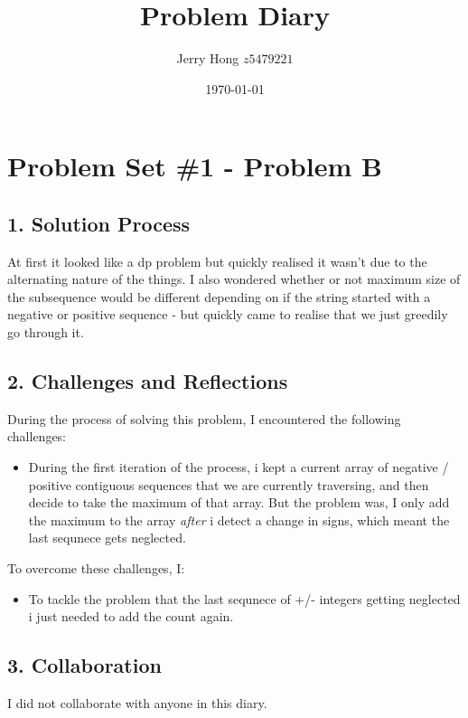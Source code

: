 \documentclass[a4paper,12pt]{article}
\title{Problem Diary}
\author{Jerry Hong $z5479221$}
\date{\today}
\begin{document}
\maketitle

\section*{Problem Set \#1 - Problem B}

\subsection*{1. Solution Process}

At first it looked like a dp problem but quickly realised it wasn't due to the alternating nature of the things. I also wondered whether or not maximum size of the subsequence would be different depending on if the string started with a negative or positive sequence - but quickly came to realise that we just greedily go through it.


\subsection*{2. Challenges and Reflections}
During the process of solving this problem, I encountered the following challenges:
\begin{itemize}
    \item 
During the first iteration of the process, i kept a current array of negative / positive contiguous sequences that we are currently traversing, and then decide to take the maximum of that array. But  the problem was, I only add the maximum to the array \emph{after} i detect a change in signs, which meant the last sequnece gets neglected. 
\end{itemize}

To overcome these challenges, I:
\begin{itemize}
    \item To tackle the problem that the last sequnece of +/- integers getting neglected i just needed to add the count again.
\end{itemize}

\subsection*{3. Collaboration}
I did not collaborate with anyone in this diary.
\end{document}
